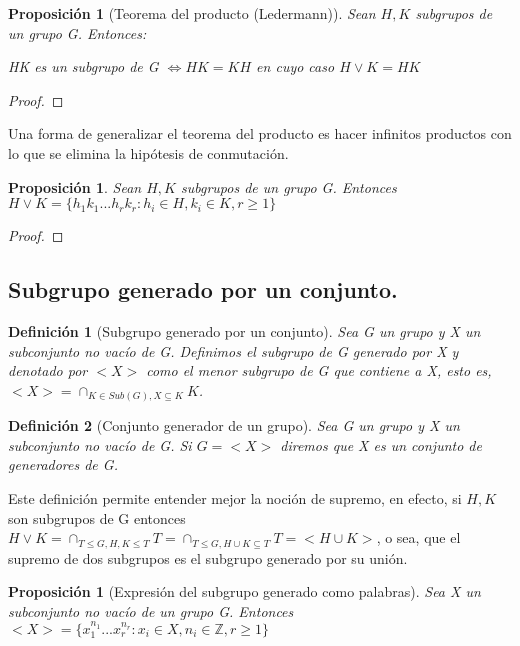 \documentclass{article}
\theoremstyle{theorem-style}  %
\newtheorem{proposition}[theorem]{Proposición}
\theoremstyle{definition-style}
\newtheorem{definition}{Definición}[section]
\theoremstyle{example-style}
\begin{document}
\begin{proposition}[Teorema del producto (Ledermann)]\label{theorem:teorema-producto}
Sean $H,K$ subgrupos de un grupo G. Entonces:

HK es un subgrupo de G $\iff HK = KH$
en cuyo caso $H \lor K = HK$
\end{proposition}

\begin{proof}

\end{proof}

Una forma de generalizar el teorema del producto es hacer infinitos productos con lo que se elimina la hipótesis de conmutación.

\begin{proposition}
Sean $H,K$ subgrupos de un grupo G. Entonces $H \lor K = \{h_1k_1...h_rk_r: h_i \in H,k_i \in K,r \ge 1\}$
\end{proposition}
\begin{proof}

\end{proof}

\subsection{Subgrupo generado por un conjunto.}

\begin{definition}[Subgrupo generado por un conjunto]
Sea G un grupo y X un subconjunto no vacío de G. Definimos el subgrupo de G generado por X y denotado por $<X>$ como el menor subgrupo de G que contiene a X, esto es, 
$<X> = \cap_{K \in Sub(G),X \subseteq K} K$.
\end{definition}

\begin{definition}[Conjunto generador de un grupo]
Sea G un grupo y X un subconjunto no vacío de G. Si $G = <X>$ diremos que X es un conjunto de generadores de G.
\end{definition}

Este definición permite entender mejor la noción de supremo, en efecto, si $H,K$ son subgrupos de G entonces $H \lor K = \cap_{T \le G, H,K \le T} T = \cap_{T \le G, H \cup K \subseteq T} T = <H \cup K>$, o sea, que el supremo de dos subgrupos es el subgrupo generado por su unión.

\begin{proposition}[Expresión del subgrupo generado como palabras]
Sea X un subconjunto no vacío de un grupo G. Entonces $<X> = \{x_1^{n_1}...x_r^{n_r}:x_i \in X,n_i \in \mathbb{Z},r \ge 1\}$
\end{proposition}
\end{document}
